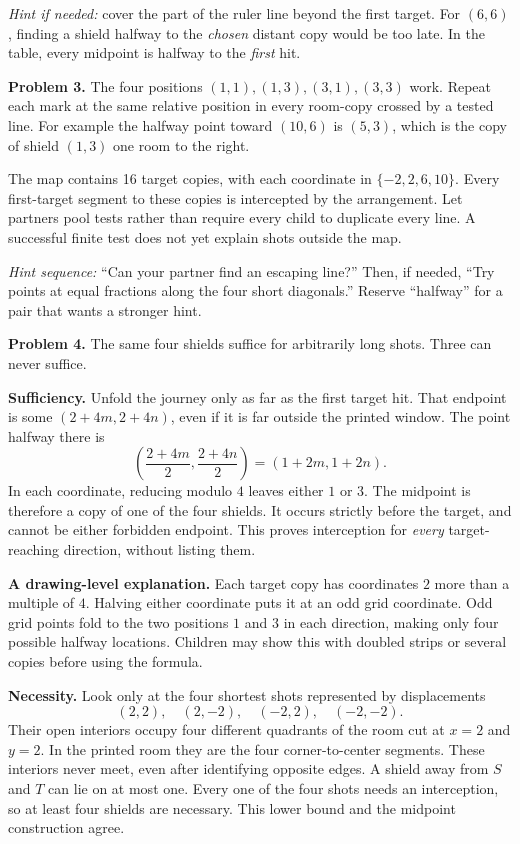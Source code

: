 \documentclass[11pt,letterpaper]{article}
\newcommand{\sectiontitle}[1]{\par\vspace{4pt}{\large\bfseries #1}\par}
\newcommand{\answer}[1]{\par\vspace{3pt}\textbf{Problem #1.} }
\begin{document}
\textit{Hint if needed:} cover the part of the ruler line beyond the first target. For $(6,6)$, finding a shield halfway to the \emph{chosen} distant copy would be too late. In the table, every midpoint is halfway to the \emph{first} hit.

\answer{3} The four positions $(1,1),(1,3),(3,1),(3,3)$ work. Repeat each mark at the same relative position in every room-copy crossed by a tested line. For example the halfway point toward $(10,6)$ is $(5,3)$, which is the copy of shield $(1,3)$ one room to the right.

The map contains 16 target copies, with each coordinate in $\{-2,2,6,10\}$. Every first-target segment to these copies is intercepted by the arrangement. Let partners pool tests rather than require every child to duplicate every line. A successful finite test does not yet explain shots outside the map.

\textit{Hint sequence:} ``Can your partner find an escaping line?'' Then, if needed, ``Try points at equal fractions along the four short diagonals.'' Reserve ``halfway'' for a pair that wants a stronger hint.
\newpage
\sectiontitle{Why four work for every shot}
\answer{4} The same four shields suffice for arbitrarily long shots. Three can never suffice.

\textbf{Sufficiency.} Unfold the journey only as far as the first target hit. That endpoint is some $(2+4m,2+4n)$, even if it is far outside the printed window. The point halfway there is
\[
\left(\frac{2+4m}{2},\frac{2+4n}{2}\right)=(1+2m,1+2n).
\]
In each coordinate, reducing modulo $4$ leaves either $1$ or $3$. The midpoint is therefore a copy of one of the four shields. It occurs strictly before the target, and cannot be either forbidden endpoint. This proves interception for \emph{every} target-reaching direction, without listing them.

\textbf{A drawing-level explanation.} Each target copy has coordinates $2$ more than a multiple of $4$. Halving either coordinate puts it at an odd grid coordinate. Odd grid points fold to the two positions $1$ and $3$ in each direction, making only four possible halfway locations. Children may show this with doubled strips or several copies before using the formula.

\textbf{Necessity.} Look only at the four shortest shots represented by displacements
\[
(2,2),\quad(2,-2),\quad(-2,2),\quad(-2,-2).
\]
Their open interiors occupy four different quadrants of the room cut at $x=2$ and $y=2$. In the printed room they are the four corner-to-center segments. These interiors never meet, even after identifying opposite edges. A shield away from $S$ and $T$ can lie on at most one. Every one of the four shots needs an interception, so at least four shields are necessary. This lower bound and the midpoint construction agree.
\end{document}
